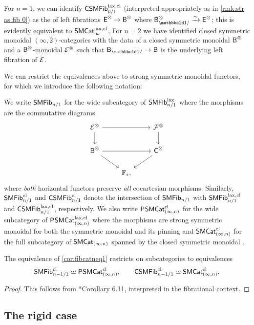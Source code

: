 \documentclass[a4paper,11pt]{article}
\begin{document}
\begin{observation}
  For $n = 1$, we can identify $\textup{\textsf{CSMFib}}^{\text{\textup{lax}},\text{\textup{cl}}}_{0/1}$ (interpreted
  appropriately as in \cref{rmk:str as fib 0}) as the \icat{} of
  left fibrations $\oE^{\otimes} \to
  \oB^{\otimes}$ where $\oB_{\bbone/}^{\otimes} \isoto \oE^{\otimes}$;
  this is evidently equivalent to $\textup{\textsf{SMCat}}_{\infty}^{\text{\textup{lax}},\text{\textup{cl}}}$.
  For $n = 2$ we have identified closed
  symmetric monoidal $(\infty,2)$-categories with the data of a closed
  symmetric monoidal \icat{} $\textup{\textsf{B}}^{\otimes}$ and a
  $\textup{\textsf{B}}^{\otimes}$-monoidal \icat{} $\mathcal{E}^{\otimes}$ such that
  $\oB_{\bbone/} \to \oB$ is the underlying left fibration of $\mathcal{E}$.
\end{observation}

We can restrict the equivalences above to strong symmetric monoidal
functors, for which we introduce the following notation:
\begin{notation}
  We write $\textup{\textsf{SMFib}}_{n/1}$ for the wide subcategory of $\textup{\textsf{SMFib}}^{\text{\textup{lax}}}_{n/1}$
  where the morphisms are the commutative diagrams
  \[
    \begin{tikzcd}
      \nE^{\otimes} \ar[rr] \ar[d] & & \nF^{\otimes} \ar[d] \\
      \oB^{\otimes} \ar[rr] \ar[dr] & & \oC^{\otimes} \ar[dl] \\
       & \xF_{*},
    \end{tikzcd}
  \]
  where \emph{both} horizontal functors preserve \emph{all} cocartesian
  morphisms. Similarly, $\textup{\textsf{SMFib}}^{\text{\textup{cl}}}_{n/1}$ and $\textup{\textsf{CSMFib}}^{\text{\textup{cl}}}_{n/1}$ denote
  the intersection of $\textup{\textsf{SMFib}}_{n/1}$ with $\textup{\textsf{SMFib}}^{\text{\textup{lax}},\text{\textup{cl}}}_{n/1}$ and
  $\textup{\textsf{CSMFib}}^{\text{\textup{lax}},\text{\textup{cl}}}_{n/1}$, respectively. We also write $\textup{\textsf{P}}^{}\textup{\textsf{SMCat}}_{(\infty,n)}^{\text{\textup{cl}}}$ for
  the wide subcategory of $\textup{\textsf{P}}^{}\textup{\textsf{SMCat}}_{(\infty,n)}^{\text{\textup{lax}},\text{\textup{cl}}}$ where the morphisms are
  strong symmetric monoidal for both the symmetric monoidal \incat{}
  and its pinning and $\textup{\textsf{SMCat}}_{(\infty,n)}^{\text{\textup{cl}}}$ for the full subcategory of
  $\textup{\textsf{SMCat}}_{(\infty,n)}$ spanned by the closed symmetric monoidal \incats{}.
\end{notation}

\begin{cor}
  The equivalence of \cref{cor:fibcatneq1} restricts on subcategories
  to equivalences
  \[ \textup{\textsf{SMFib}}^{\text{\textup{cl}}}_{n-1/1} \simeq \textup{\textsf{P}}^{}\textup{\textsf{SMCat}}_{(\infty,n)}^{\text{\textup{cl}}}, \qquad \textup{\textsf{CSMFib}}^{\text{\textup{cl}}}_{n-1/1}
    \simeq \textup{\textsf{SMCat}}_{(\infty,n)}^{\text{\textup{cl}}}.\]
\end{cor}
\begin{proof}
  This follows from \cite{closed}*{Corollary 6.11}, interpreted in the fibrational context.
\end{proof}

\subsection{The rigid case}
\label{sec:rigid}
\end{document}
